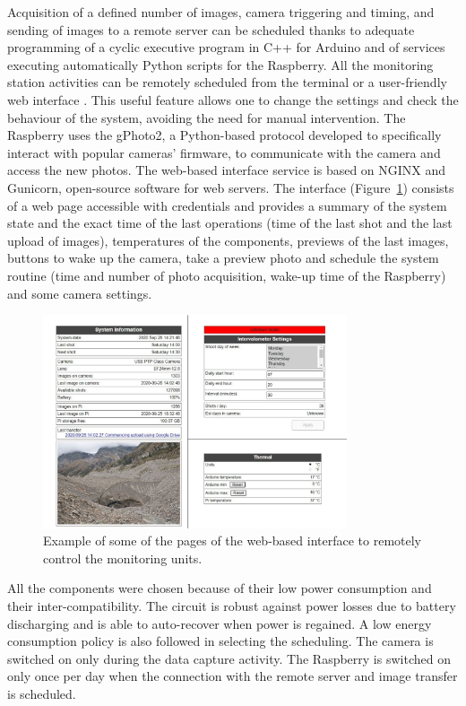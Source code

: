 Acquisition of a defined number of images, camera triggering and timing, and sending of
images to a remote server can be scheduled thanks to adequate programming of a cyclic
executive program in C++ for Arduino and  of services executing automatically Python
scripts for the Raspberry.
All the monitoring station activities can be remotely scheduled from the terminal or a
user-friendly web interface \citep{greig}. This useful feature allows one to change the
settings and check the behaviour of the system, avoiding the need for manual
intervention. The Raspberry uses the gPhoto2, a Python-based protocol developed to
specifically interact with popular cameras’ firmware, to communicate with the camera and
access the new photos. The  web-based interface service is based on NGINX and Gunicorn,
open-source software for web servers. The interface (Figure~\ref{fig:web-interface})
consists of a web page accessible with credentials and provides a summary of the system
state and the exact time of the last operations (time of the last shot and the last
upload of images), temperatures of the components, previews of the last images, buttons
to wake up the camera, take a preview photo and schedule the system routine (time and
number of photo acquisition, wake-up time of the Raspberry) and some camera settings.

\begin{figure}[h!]
  \centering
  \includegraphics[width=0.8\textwidth]{web_interface.png}
  \caption{Example of some of the pages of the web-based interface to remotely control
    the monitoring units.}
  \label{fig:web-interface}
\end{figure}

All the components were chosen because of their low power consumption and their
inter-compatibility. The circuit is robust against power losses due to battery
discharging and is able to auto-recover when power is regained. A low energy consumption
policy is also followed in selecting the scheduling. The camera is switched on only
during the data capture activity. The Raspberry is switched on only once per day when the
connection with the remote server and image transfer is scheduled.

